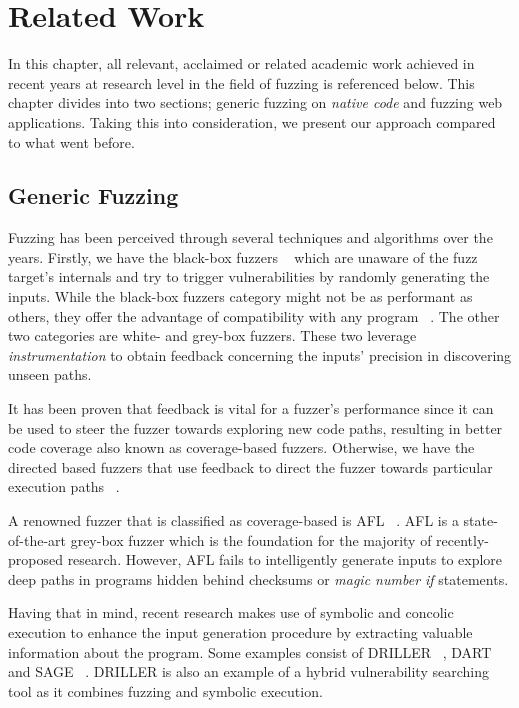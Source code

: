 \chapter{Related Work}
\label{sec:relatedwork}
\minitoc
\vspace*{1cm}

In this chapter, all relevant, acclaimed or related academic work achieved in recent years at research level in the field of fuzzing is referenced below. This chapter divides into two sections; generic fuzzing on \emph{native code} and fuzzing web applications. Taking this into consideration, we present our approach compared to what went before.

\section{Generic Fuzzing}
Fuzzing has been perceived through several techniques and algorithms over the years. Firstly, we have the black-box fuzzers ~\cite{householder2012probability,sparks2007automated,woo2013scheduling} which are unaware of the fuzz target's internals and try to trigger vulnerabilities by randomly generating the inputs. While the black-box fuzzers category might not be as performant as others, they offer the advantage of compatibility with any program ~\cite{osterlund2020parmesan,rawat2017vuzzer}. The other two categories are white- and grey-box fuzzers. These two leverage \emph{instrumentation} to obtain feedback concerning the inputs' precision in discovering unseen paths. 

It has been proven that feedback is vital for a fuzzer's performance since it can be used to steer the fuzzer towards exploring new code paths, resulting in better code coverage also known as
coverage-based fuzzers. Otherwise, we have the directed based fuzzers that use feedback to direct the fuzzer towards particular execution paths ~\cite{godefroid2005dart}.

A renowned fuzzer that is classified as coverage-based is AFL ~\cite{zalewski2015american}. AFL is a state-of-the-art grey-box fuzzer which is the foundation for the majority of recently-proposed research. However, AFL fails to intelligently generate inputs to explore deep paths in programs hidden behind checksums or \emph{magic number if} statements.

Having that in mind, recent research makes use of symbolic and concolic execution to enhance the input generation procedure by extracting valuable information about the program. Some examples consist of DRILLER ~\cite{stephens2016driller}, DART ~\cite{godefroid2005dart} and SAGE ~\cite{godefroid2012sage}. DRILLER is also an example of a hybrid vulnerability searching tool as it combines fuzzing and symbolic execution.

